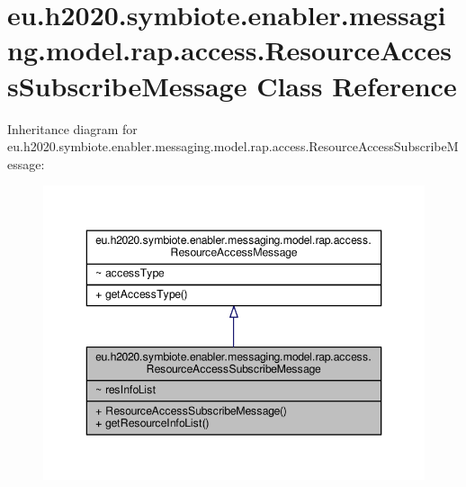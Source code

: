 \hypertarget{classeu_1_1h2020_1_1symbiote_1_1enabler_1_1messaging_1_1model_1_1rap_1_1access_1_1ResourceAccessSubscribeMessage}{}\section{eu.\+h2020.\+symbiote.\+enabler.\+messaging.\+model.\+rap.\+access.\+Resource\+Access\+Subscribe\+Message Class Reference}
\label{classeu_1_1h2020_1_1symbiote_1_1enabler_1_1messaging_1_1model_1_1rap_1_1access_1_1ResourceAccessSubscribeMessage}


Inheritance diagram for eu.\+h2020.\+symbiote.\+enabler.\+messaging.\+model.\+rap.\+access.\+Resource\+Access\+Subscribe\+Message\+:
\nopagebreak
\begin{figure}[H]
\begin{center}
\leavevmode
\includegraphics[width=346pt]{classeu_1_1h2020_1_1symbiote_1_1enabler_1_1messaging_1_1model_1_1rap_1_1access_1_1ResourceAccess3d2a5fbac9cb792faa273fc1360b7c8a}
\end{center}
\end{figure}


